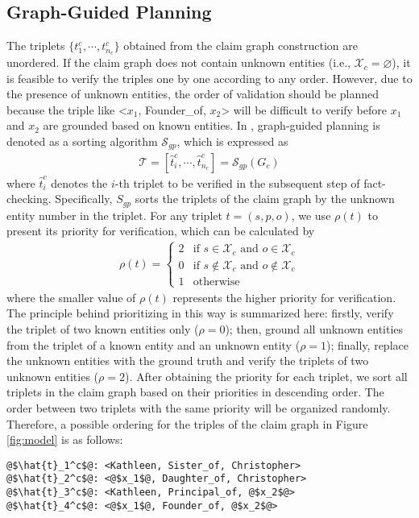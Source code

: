 \subsection{Graph-Guided Planning}\label{sec:Graph-Guided Planning}
The triplets $\{t^c_1, \cdots, t^c_{n_c}\}$ obtained from the claim graph construction are unordered. If the claim graph does not contain unknown entities (i.e., $\mathcal{X}_c=\varnothing$), it is feasible to verify the triples one by one according to any order. However, due to the presence of unknown entities, the order of validation should be planned because the triple like <$x_1$, Founder\_of, $x_2$>  will be difficult to verify before $x_1$ and $x_2$ are grounded based on known entities. In {\MyFC}, graph-guided planning is denoted as a sorting algorithm $\mathcal{S}_{gp}$, which is expressed as
\begin{align}\label{eq:planning}
    \mathcal{T} = \left[\hat{t}_i^c,\cdots,\hat{t}^c_{n_c}\right] = \mathcal{S}_{gp}(G_c)
\end{align}
where $\hat{t}_i^c$ denotes the $i$-th triplet to be verified in the subsequent step of fact-checking. Specifically, $S_{gp}$ sorts the triplets of the claim graph by the unknown entity number in the triplet. For any triplet $t=(s, p, o)$, we use $\rho(t)$ to present its priority for verification, which can be calculated by
\begin{align}
\rho(t) = \begin{cases} 
2 & \text{if } s \in \mathcal{X}_c \text{ and } o \in \mathcal{X}_c  \\
0 & \text{if } s \notin \mathcal{X}_c \text{ and } o \notin \mathcal{X}_c \\
1 & \text{otherwise}
\end{cases}
\end{align}
where the smaller value of $\rho(t)$ represents the higher priority for verification. The principle behind prioritizing in this way is summarized here: firstly, verify the triplet of two known entities only ($\rho=0$); then, ground all unknown entities from the triplet of a known entity and an unknown entity ($\rho=1$); finally, replace the unknown entities with the ground truth and verify the triplets of two unknown entities ($\rho=2$). After obtaining the priority for each triplet, we sort all triplets in the claim graph based on their priorities in descending order. The order between two triplets with the same priority will be organized randomly. Therefore, a possible ordering for the triples of the claim graph in Figure \ref{fig:model} is as follows:
\begin{lstlisting}[style=myStyle*]
@$\hat{t}_1^c$@: <Kathleen, Sister_of, Christopher>
@$\hat{t}_2^c$@: <@$x_1$@, Daughter_of, Christopher>
@$\hat{t}_3^c$@: <Kathleen, Principal_of, @$x_2$@>
@$\hat{t}_4^c$@: <@$x_1$@, Founder_of, @$x_2$@>
\end{lstlisting}

